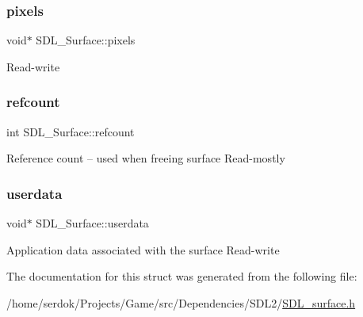 \subsubsection{\texorpdfstring{pixels}{pixels}}
{\footnotesize\ttfamily void$\ast$ S\+D\+L\+\_\+\+Surface\+::pixels}

Read-\/write \mbox{\label{structSDL__Surface_a03d10628a359c0674f5ceffd574f1641}} 
\subsubsection{\texorpdfstring{refcount}{refcount}}
{\footnotesize\ttfamily int S\+D\+L\+\_\+\+Surface\+::refcount}

Reference count -- used when freeing surface Read-\/mostly \mbox{\label{structSDL__Surface_ae66d973dcb9b57cb34815892e1ee1f31}} 
\subsubsection{\texorpdfstring{userdata}{userdata}}
{\footnotesize\ttfamily void$\ast$ S\+D\+L\+\_\+\+Surface\+::userdata}

Application data associated with the surface Read-\/write 

The documentation for this struct was generated from the following file\+:\begin{DoxyCompactItemize}
\item 
/home/serdok/\+Projects/\+Game/src/\+Dependencies/\+S\+D\+L2/\hyperlink{SDL__surface_8h}{S\+D\+L\+\_\+surface.\+h}\end{DoxyCompactItemize}
